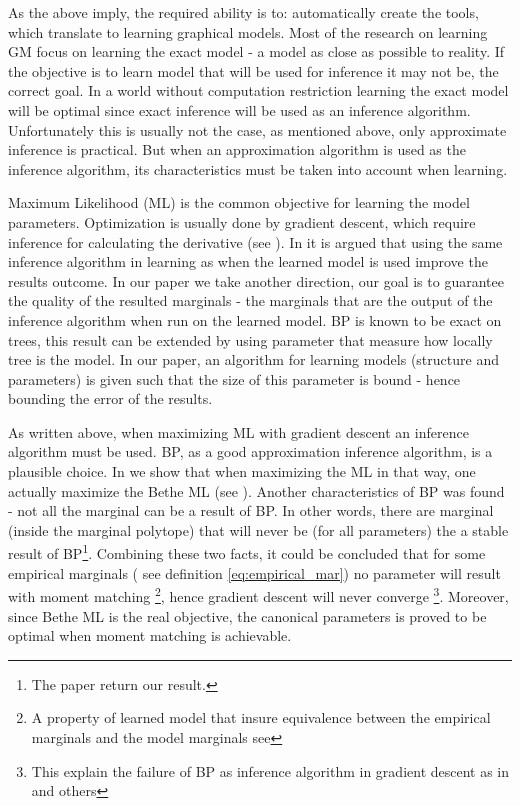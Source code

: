 As the above imply, the required ability is to: automatically create the tools, which translate to learning graphical models.
Most of the research on learning GM focus on learning the exact model - a model as close as possible to reality.
If the objective is to learn model that will be used for inference it may not be, the correct goal.
In a world without computation restriction learning the exact model will be optimal since exact inference will be used as an inference algorithm.
Unfortunately this is usually not the case, as mentioned above, only approximate inference is practical.
But when an approximation algorithm is used as the inference algorithm, its characteristics must be taken into account when learning.

Maximum Likelihood (ML) is the common objective for learning the model parameters.
Optimization is usually done by gradient descent, which require inference for calculating the derivative (see ).
In \cite{wainwright2006estimating} it is argued that using the same inference algorithm in learning as when the learned model is used improve the results outcome.
In our paper \cite{heinemann2014inferning} we take another direction, our goal is to guarantee the quality of the resulted marginals - the marginals that are the output of the inference algorithm when run on the learned model.
BP is known to be exact on trees, this result can be extended by using parameter that measure how locally tree is the model.
In our paper, an algorithm for learning models (structure and parameters) is given such that the size of this parameter is bound - hence bounding the error of the results.

As written above, when maximizing ML with gradient descent an inference algorithm must be used.
BP, as a good approximation inference algorithm, is a plausible choice.
In \cite{heinemann2012cannot} we show that when maximizing the ML in that way, one actually maximize the Bethe ML (see ).
Another characteristics of BP was found - not all the marginal can be a result of BP.
In other words, there are marginal (inside the marginal polytope) that will never be (for all parameters) the a stable result of BP\footnote{ The paper \cite{pitkow2011learning} return our result.}.
Combining these two facts, it could be concluded that for some empirical marginals ( see definition \eqref{eq:empirical_mar}) no parameter will result with moment matching \footnote{ A property of learned model that insure equivalence between the empirical marginals and the model marginals see }, hence gradient descent will never converge \footnote{This explain the failure of BP as inference algorithm in gradient descent as in \cite{wainwright2006estimating} and others}.
Moreover, since Bethe ML is the real objective, the canonical parameters is proved to be optimal when moment matching is achievable.

